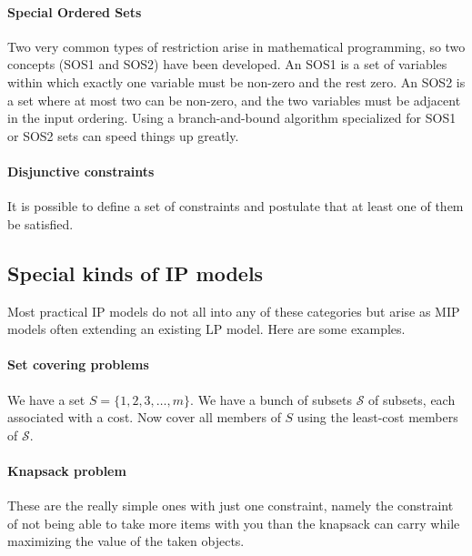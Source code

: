 \documentclass[13pt, letterpaper, twoside]{book}
\begin{document}
\paragraph*{Special Ordered Sets}
Two very common types of restriction arise in mathematical programming, so two concepts (SOS1 and SOS2) have been developed. An SOS1 is a set of variables within which exactly one variable must be non-zero and the rest zero. An SOS2 is a set where at most two can be non-zero, and the two variables must be adjacent in the input ordering. Using a branch-and-bound algorithm specialized for SOS1 or SOS2 sets can speed things up greatly.

\paragraph*{Disjunctive constraints}
It is possible to define a set of constraints and postulate that at least one of them be satisfied.

\subsection{Special kinds of IP models}
Most practical IP models do not all into any of these categories but arise as MIP models often extending an existing LP model. Here are some examples.

\paragraph*{Set covering problems} We have a set $S = \{1,2,3,\dots,m\}$. We have a bunch of subsets $\mathcal{S}$ of subsets, each associated with a cost. Now cover all members of $S$ using the least-cost members of $\mathcal{S}$.

\paragraph*{Knapsack problem} These are the really simple ones with just one constraint, namely the constraint of not being able to take more items with you than the knapsack can carry while maximizing the value of the taken objects.
\end{document}

